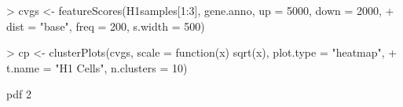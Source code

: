 \begin{Schunk}
\begin{Sinput}
> cvgs <- featureScores(H1samples[1:3], gene.anno, up = 5000, down = 2000, 
+     dist = "base", freq = 200, s.width = 500)
\end{Sinput}
\end{Schunk}


\begin{Schunk}
\begin{Sinput}
> cp <- clusterPlots(cvgs, scale = function(x) sqrt(x), plot.type = "heatmap", 
+     t.name = "H1 Cells", n.clusters = 10)
\end{Sinput}
\end{Schunk}

\begin{Schunk}
\begin{Soutput}
pdf 
  2 
\end{Soutput}
\end{Schunk}
